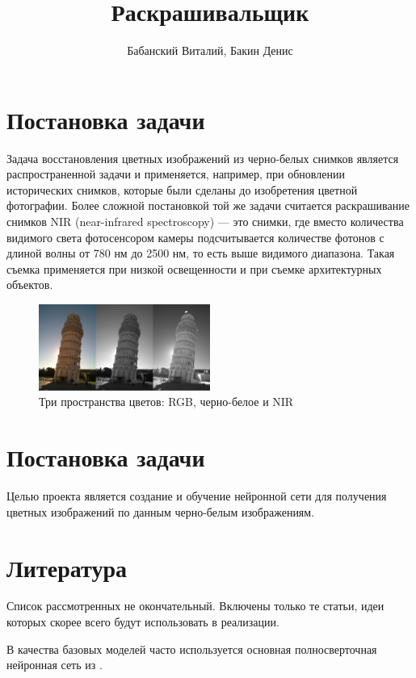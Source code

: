 \documentclass[14pt]{article}
\title{Раскрашивальщик}
\author{Бабанский Виталий, Бакин Денис}
\begin{document}
\maketitle

\section{Постановка задачи}

Задача восстановления цветных изображений из черно-белых снимков является распространенной задачи и применяется, например,
при обновлении исторических снимков, которые были сделаны до изобретения цветной фотографии.
Более сложной постановкой той же задачи считается раскрашивание снимков NIR (near-infrared spectroscopy) ---
это снимки, где вместо количества видимого света фотосенсором камеры подсчитывается количестве фотонов с длиной волны
от 780 нм до 2500 нм, то есть выше видимого диапазона. Такая съемка применяется при низкой освещенности и
при съемке архитектурных объектов.

\begin{figure}[H]
    \centering
    \includegraphics[width=0.5\textwidth]{resources/pisa_tower_3_colorspaces.jpg}
    \caption{Три пространства цветов: RGB, черно-белое и NIR}
    \label{fig:id_figura}
\end{figure}

\section{Постановка задачи}
Целью проекта является создание и обучение нейронной сети для получения цветных изображений по данным черно-белым изображениям.


\section{Литература}
Список рассмотренных не окончательный. Включены только те статьи, идеи которых скорее всего будут использовать в реализации.

В качества базовых моделей часто используется основная полносверточная нейронная сеть из \cite[numeric]{GuidedImageColorization}.
\end{document}

